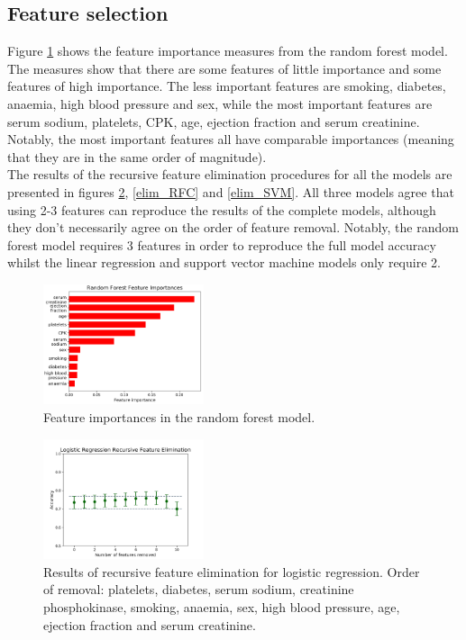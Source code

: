 \documentclass[notitlepage, reprint, nofootinbib]{revtex4-1}
\begin{document}
\subsection{Feature selection}
Figure \ref{feature_imp_RFC} shows the feature importance measures from the random forest model. The measures show that there are some features of little importance and some features of high importance. The less important features are smoking, diabetes, anaemia, high blood pressure and sex, while the most important features are serum sodium, platelets, CPK, age, ejection fraction and serum creatinine. Notably, the most important features all have comparable importances (meaning that they are in the same order of magnitude).\\[2mm]
The results of the recursive feature elimination procedures for all the models are presented in figures \ref{elim_LR}, \ref{elim_RFC} and \ref{elim_SVM}. All three models agree that using 2-3 features can reproduce the results of the complete models, although they don't necessarily agree on the order of feature removal. Notably, the random forest model requires 3 features in order to reproduce the full model accuracy whilst the linear regression and support vector machine models only require 2. 
\begin{figure}[h!]
	\centering
	\includegraphics[width=0.42\textwidth]{../Figures/feature_importances_RFC.png}
	\caption{Feature importances in the random forest model. }
	\label{feature_imp_RFC}
\end{figure}

\begin{figure}[h!]
	\centering
	\includegraphics[width=0.42\textwidth]{../Figures/recursive_feature_elimination_LR.png}
	\caption{Results of recursive feature elimination for logistic regression. Order of removal: platelets, diabetes, serum sodium, creatinine phosphokinase, smoking, anaemia, sex, high blood pressure, age, ejection fraction and serum creatinine.}
	\label{elim_LR}
\end{figure}
\end{document}
